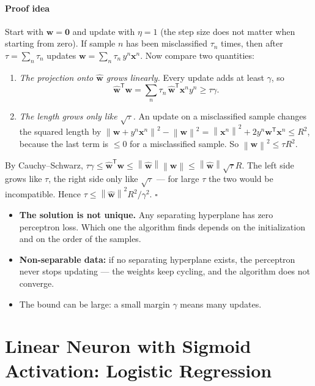 \documentclass[11pt, oneside]{book}
\newcommand{\norm}[1]{\left\lVert #1 \right\rVert}
\newcommand{\T}{^{\mathsf{T}}}           %
\newcommand{\bx}{\bm{x}}        \newcommand{\by}{\bm{y}}
\newcommand{\bw}{\bm{w}}        \newcommand{\bW}{\bm{W}}
\newcommand{\what}{\hat{\bm{w}}}
\let\originalsection\section
\renewcommand{\section}{\Needspace{7\baselineskip}\originalsection}
\begin{document}
\paragraph{Proof idea} Start with $\bw = \bm{0}$ and update with $\eta = 1$
(the step size does not matter when starting from zero). If sample $n$ has
been misclassified $\tau_n$ times, then after $\tau = \sum_n \tau_n$ updates
$\bw = \sum_n \tau_n\, y^n\bx^n$. Now compare two quantities:
\begin{enumerate}
  \item \emph{The projection onto $\what$ grows linearly.} Every update adds
    at least $\gamma$, so
    \[
      \what\T\bw = \sum_n \tau_n\, \what\T\bx^n y^n \ge \tau\gamma .
    \]
  \item \emph{The length grows only like $\sqrt\tau$.} An update on a
    misclassified sample changes the squared length by
    $\norm{\bw + y^n\bx^n}^2 - \norm{\bw}^2 = \norm{\bx^n}^2 + 2y^n\bw\T\bx^n
    \le R^2$, because the last term is $\le 0$ for a misclassified sample.
    So $\norm{\bw}^2 \le \tau R^2$.
\end{enumerate}
By Cauchy--Schwarz, $\tau\gamma \le \what\T\bw \le \norm{\what}\norm{\bw}
\le \norm{\what}\sqrt{\tau}R$. The left side grows like $\tau$, the right
side only like $\sqrt\tau$ --- for large $\tau$ the two would be
incompatible. Hence $\tau \le \norm{\what}^2R^2/\gamma^2$. \hfill$\square$

\begin{notebox}[title={What the theorem does \emph{not} say}]
\begin{itemize}
  \item \textbf{The solution is not unique.} Any separating hyperplane has
    zero perceptron loss. Which one the algorithm finds depends on the
    initialization and on the order of the samples.
  \item \textbf{Non-separable data:} if no separating hyperplane exists, the
    perceptron never stops updating --- the weights keep cycling, and the
    algorithm does not converge.
  \item The bound can be large: a small margin $\gamma$ means many updates.
\end{itemize}
\end{notebox}


\section{Linear Neuron with Sigmoid Activation: Logistic Regression}
\label{sec:logreg}
\end{document}
